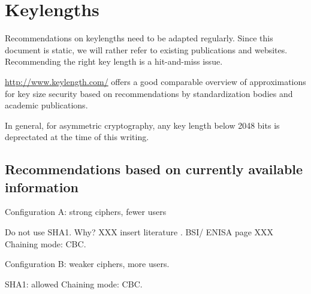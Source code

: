 \section{Keylengths}

Recommendations on keylengths need to be adapted regularly. Since this document is static, we will rather refer to 
existing publications and websites.  Recommending the right key length is a hit-and-miss issue.

\url{http://www.keylength.com/} offers a good comparable overview of approximations for key size security based on recommendations by standardization bodies and academic publications.

In general, for asymmetric cryptography, any key length below 2048 bits is deprectated at the time of this writing.





\subsection{Recommendations based on currently available information}

Configuration A:
strong ciphers, fewer users

Do not use SHA1. Why? XXX insert literature . BSI/ ENISA page XXX
Chaining mode: CBC.


Configuration B:
weaker ciphers, more users.

SHA1:  allowed
Chaining mode: CBC.


